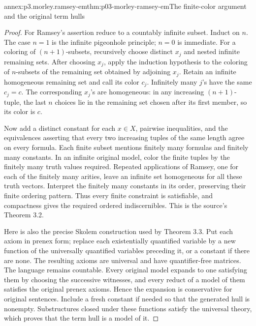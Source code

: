 \begin{annexitem}{annex:p3.morley.ramsey-em}{thm:p03-morley-ramsey-em}{The finite-color argument and the original term hulls}
\begin{proof}
For Ramsey's assertion reduce to a countably infinite subset.
Induct on \(n\). The case \(n=1\) is the infinite pigeonhole
principle; \(n=0\) is immediate. For a coloring of
\((n+1)\)-subsets, recursively choose distinct \(x_j\) and
nested infinite remaining sets. After choosing \(x_j\),
apply the induction hypothesis to the coloring of
\(n\)-subsets of the remaining set obtained by adjoining
\(x_j\). Retain an infinite homogeneous remaining set
and call its color \(c_j\). Infinitely many \(j\)'s
have the same \(c_j=c\). The corresponding \(x_j\)'s
are homogeneous: in any increasing \((n+1)\)-tuple,
the last \(n\) choices lie in the remaining set chosen
after its first member, so its color is \(c\).

Now add a distinct constant for each \(x\in X\),
pairwise inequalities, and the equivalences asserting
that every two increasing tuples of the same length
agree on every formula. Each finite subset mentions
finitely many formulas and finitely many constants.
In an infinite original model, color the finite tuples
by the finitely many truth values required. Repeated
applications of Ramsey, one for each of the finitely
many arities, leave an infinite set homogeneous for
all these truth vectors. Interpret the finitely many
constants in its order, preserving their finite
ordering pattern. Thus every finite constraint is
satisfiable, and compactness gives the required
ordered indiscernibles. This is the source's Theorem 3.2.

Here is also the precise Skolem construction used by
Theorem 3.3. Put each axiom in prenex form; replace
each existentially quantified variable by a new
function of the universally quantified variables
preceding it, or a constant if there are none.
The resulting axioms are universal and have quantifier-free
matrices. The language remains countable. Every
original model expands to one satisfying them by
choosing the successive witnesses, and every reduct
of a model of them satisfies the original prenex
axioms. Hence the expansion is conservative for
original sentences. Include a fresh constant if
needed so that the generated hull is nonempty.
Substructures closed under these functions satisfy
the universal theory, which proves that the term
hull is a model of it.


\end{proof}
\end{annexitem}
